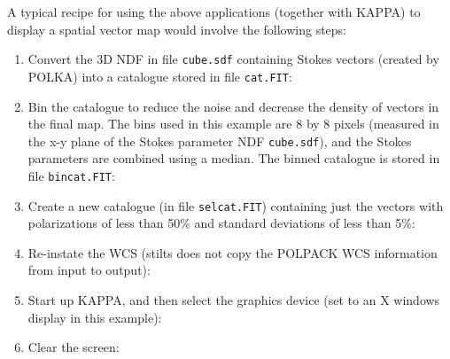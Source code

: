 \documentclass[twoside,11pt]{starlink}
\begin{document}
A typical recipe for using the above applications (together with KAPPA)
to display a spatial vector map would involve the following steps:

\begin{enumerate}

\item Convert the 3D NDF in file \verb+cube.sdf+ containing Stokes vectors
(created by POLKA) into a catalogue stored in file \verb+cat.FIT+:

\begin{terminalv}
\end{terminalv}

\item Bin the catalogue to reduce the noise and decrease the density
of vectors in the final map. The bins used in this example are 8 by
8 pixels (measured in
the x-y plane of the Stokes parameter NDF \verb+cube.sdf+), and the
Stokes parameters are combined using a median. The binned catalogue is
stored in file \verb+bincat.FIT+:

\begin{terminalv}
\end{terminalv}

\item Create a new catalogue (in file \verb+selcat.FIT+) containing just
the vectors with polarizations of less than 50\% and standard deviations of
less than 5\%:

\begin{terminalv}
\end{terminalv}

\item Re-instate the WCS (stilts does not copy the POLPACK WCS information
from input to output):

\begin{terminalv}
\end{terminalv}

\item \label{STEP:DEVICE} Start up KAPPA, and then select the graphics
device (set to an X windows display in this example):
\begin{terminalv}
\end{terminalv}

\item Clear the screen:
\begin{terminalv}
\end{terminalv}


\end{enumerate}
\end{document}
